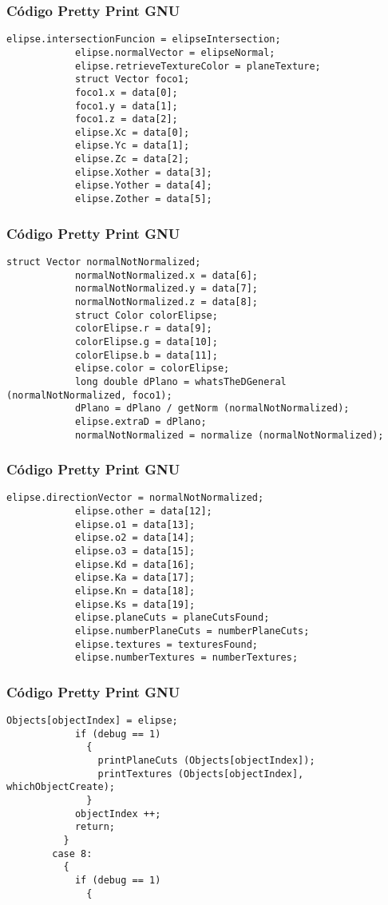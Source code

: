 \documentclass{beamer}
\begin{document}
\begin{frame}[fragile]
\frametitle{C\'odigo Pretty Print GNU}
\begin{lstlisting}[style=CStyle]
            elipse.intersectionFuncion = elipseIntersection;
            elipse.normalVector = elipseNormal;
            elipse.retrieveTextureColor = planeTexture;
            struct Vector foco1;
            foco1.x = data[0];
            foco1.y = data[1];
            foco1.z = data[2];
            elipse.Xc = data[0];
            elipse.Yc = data[1];
            elipse.Zc = data[2];
            elipse.Xother = data[3];
            elipse.Yother = data[4];
            elipse.Zother = data[5];
\end{lstlisting}
\end{frame}
\begin{frame}[fragile]
\frametitle{C\'odigo Pretty Print GNU}
\begin{lstlisting}[style=CStyle]
            struct Vector normalNotNormalized;
            normalNotNormalized.x = data[6];
            normalNotNormalized.y = data[7];
            normalNotNormalized.z = data[8];
            struct Color colorElipse;
            colorElipse.r = data[9];
            colorElipse.g = data[10];
            colorElipse.b = data[11];
            elipse.color = colorElipse;
            long double dPlano = whatsTheDGeneral (normalNotNormalized, foco1);
            dPlano = dPlano / getNorm (normalNotNormalized);
            elipse.extraD = dPlano;
            normalNotNormalized = normalize (normalNotNormalized);
\end{lstlisting}
\end{frame}
\begin{frame}[fragile]
\frametitle{C\'odigo Pretty Print GNU}
\begin{lstlisting}[style=CStyle]
            elipse.directionVector = normalNotNormalized;
            elipse.other = data[12];
            elipse.o1 = data[13];
            elipse.o2 = data[14];
            elipse.o3 = data[15];
            elipse.Kd = data[16];
            elipse.Ka = data[17];
            elipse.Kn = data[18];
            elipse.Ks = data[19];
            elipse.planeCuts = planeCutsFound;
            elipse.numberPlaneCuts = numberPlaneCuts;
            elipse.textures = texturesFound;
            elipse.numberTextures = numberTextures;
\end{lstlisting}
\end{frame}
\begin{frame}[fragile]
\frametitle{C\'odigo Pretty Print GNU}
\begin{lstlisting}[style=CStyle]
            Objects[objectIndex] = elipse;
            if (debug == 1)
              {
                printPlaneCuts (Objects[objectIndex]);
                printTextures (Objects[objectIndex], whichObjectCreate);
              }
            objectIndex ++;
            return;
          }
        case 8:
          {
            if (debug == 1)
              {
                \end{lstlisting}
\end{frame}
\end{document}
